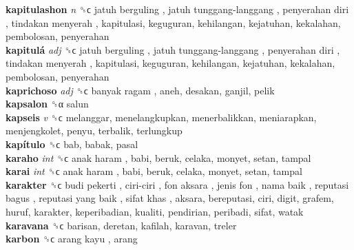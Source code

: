\textbf{kapitulashon} \emph{n}  ␝ϲ   jatuh berguling ,  jatuh tunggang-langgang ,  penyerahan diri ,  tindakan menyerah , kapitulasi, keguguran, kehilangan, kejatuhan, kekalahan, pembolosan, penyerahan  \\
\textbf{kapitulá} \emph{adj}  ␝ϲ   jatuh berguling ,  jatuh tunggang-langgang ,  penyerahan diri ,  tindakan menyerah , kapitulasi, keguguran, kehilangan, kejatuhan, kekalahan, pembolosan, penyerahan  \\
\textbf{kaprichoso} \emph{adj}  ␝ϲ   banyak ragam , aneh, desakan, ganjil, pelik  \\
\textbf{kapsalon} ␝α  salun  \\
\textbf{kapseis} \emph{v}  ␝ϲ  melanggar, menelangkupkan, menerbalikkan, meniarapkan, menjengkolet, penyu, terbalik, terlungkup  \\
\textbf{kapítulo} ␝ϲ  bab, babak, pasal  \\
\textbf{karaho} \emph{int}  ␝ϲ   anak haram , babi, beruk, celaka, monyet, setan, tampal  \\
\textbf{karai} \emph{int}  ␝ϲ   anak haram , babi, beruk, celaka, monyet, setan, tampal  \\
\textbf{karakter} ␝ϲ   budi pekerti ,  ciri-ciri ,  fon aksara ,  jenis fon ,  nama baik ,  reputasi bagus ,  reputasi yang baik ,  sifat khas , aksara, bereputasi, ciri, digit, grafem, huruf, karakter, keperibadian, kualiti, pendirian, peribadi, sifat, watak  \\
\textbf{karavana} ␝ϲ  barisan, deretan, kafilah, karavan, treler  \\
\textbf{karbon} ␝ϲ   arang kayu , arang  \\
